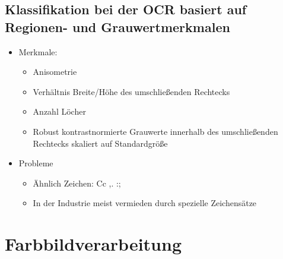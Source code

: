 \documentclass[11pt]{article}
\begin{document}
\subsection{Klassifikation bei der OCR basiert auf Regionen- und Grauwertmerkmalen}
    \begin{itemize}
        \item Merkmale:
            \begin{itemize}
                \item Anisometrie
                \item Verhältnis Breite/Höhe des umschließenden Rechtecks
                \item  Anzahl Löcher
                \item Robust kontrastnormierte Grauwerte innerhalb des umschließenden Rechtecks skaliert auf Standardgröße
            \end{itemize}
        \item Probleme
            \begin{itemize}
                \item Ähnlich Zeichen: Cc ,. :;
                \item In der Industrie meist vermieden durch spezielle Zeichensätze
            \end{itemize}
    \end{itemize}

\section{Farbbildverarbeitung}
\end{document}
